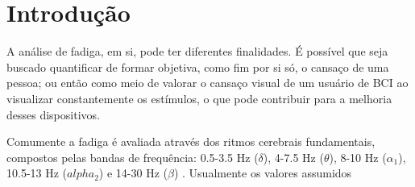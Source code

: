 \chapter[Introdução]{Introdução}

A análise de fadiga, em si, pode ter diferentes finalidades. É possível que seja buscado quantificar de formar objetiva, como fim por si só, o cansaço de uma pessoa; ou então como meio de valorar o cansaço visual de um usuário de BCI ao visualizar constantemente os estímulos, o que pode contribuir para a melhoria desses dispositivos.

Comumente a fadiga é avaliada através dos ritmos cerebrais fundamentais, compostos pelas bandas de frequência: 0.5-3.5 Hz ($\delta$), 4-7.5 Hz ($\theta$), 8-10 Hz ($\alpha_1$), 10.5-13 Hz ($alpha_2$) e 14-30 Hz ($\beta$) \cite{Craig2012}. Usualmente os valores assumidos